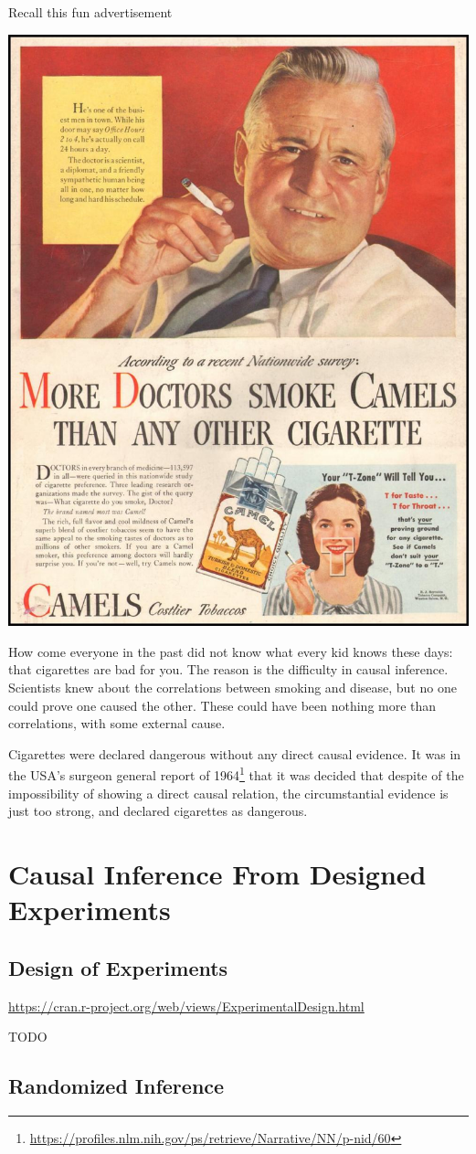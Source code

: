 \documentclass[]{book}
\renewcommand{\href}[2]{#2\footnote{\url{#1}}}
\theoremstyle{definition}
\theoremstyle{definition}
\theoremstyle{definition}
\theoremstyle{remark}
\begin{document}
Recall this fun advertisement

\includegraphics[width=0.5\linewidth]{art/wor}

How come everyone in the past did not know what every kid knows these days: that cigarettes are bad for you.
The reason is the difficulty in causal inference.
Scientists knew about the correlations between smoking and disease, but no one could prove one caused the other. These could have been nothing more than correlations, with some external cause.

Cigarettes were declared dangerous without any direct causal evidence.
It was in the USA's \href{https://profiles.nlm.nih.gov/ps/retrieve/Narrative/NN/p-nid/60}{surgeon general report of 1964} that it was decided that despite of the impossibility of showing a direct causal relation, the circumstantial evidence is just too strong, and declared cigarettes as dangerous.

\hypertarget{causal-inference-from-designed-experiments}{%
\section{Causal Inference From Designed Experiments}\label{causal-inference-from-designed-experiments}}

\hypertarget{design-of-experiments}{%
\subsection{Design of Experiments}\label{design-of-experiments}}

\url{https://cran.r-project.org/web/views/ExperimentalDesign.html}

TODO

\hypertarget{randomized-inference}{%
\subsection{Randomized Inference}\label{randomized-inference}}
\end{document}
